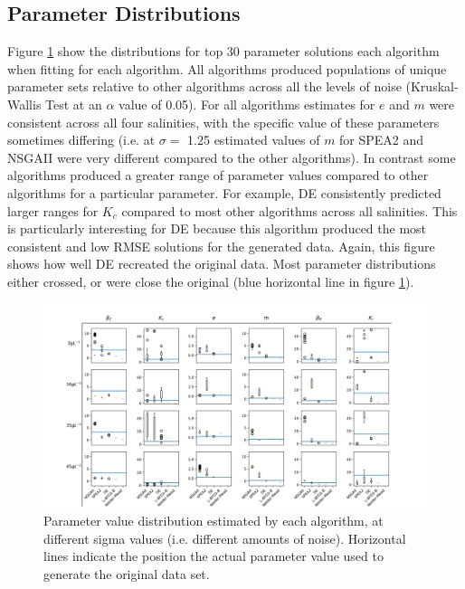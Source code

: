 \documentclass[twocolumn, 9pt]{article}
\begin{document}
\subsection{Parameter Distributions}
\indent{} Figure \ref{fig:SigmaParameterSols} show the distributions for top 30 parameter solutions each algorithm when fitting for each algorithm. All algorithms produced populations of unique parameter sets relative to other algorithms across all the levels of noise (Kruskal-Wallis Test at an $\alpha$ value of 0.05). For all algorithms estimates for $e$ and $m$ were consistent across all four salinities, with the specific value of these parameters sometimes differing (i.e. at $\sigma =$ 1.25 estimated values of $m$ for SPEA2 and NSGAII were very different compared to the other algorithms). In contrast some algorithms produced a greater range of parameter values compared to other algorithms for a particular parameter. For example, DE consistently predicted larger ranges for $K_c$ compared to most other algorithms across all salinities. This is particularly interesting for DE because this algorithm produced the most consistent and low RMSE solutions for the generated data. Again, this figure shows how well DE recreated the original data. Most parameter distributions either crossed, or were close the original (blue horizontal line in figure \ref{fig:SigmaParameterSols}).

\begin{figure}[t]
    \centering
    \includegraphics[width=\textwidth]{sigmaParameterFig.png}
    \caption{Parameter value distribution estimated by each algorithm, at different sigma values (i.e. different amounts of noise). Horizontal lines indicate the position the actual parameter value used to generate the original data set.}
    \label{fig:SigmaParameterSols}
\end{figure}
\end{document}
